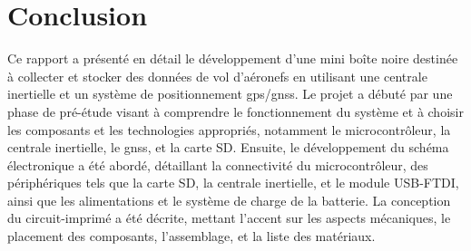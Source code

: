 \documentclass[12pt,a4paper,twoside]{article}
\newcommand\blankpage{%
	\null
	\thispagestyle{empty}%
	\addtocounter{page}{-1}%
	\newpage}
\begin{document}
\pagestyle{fancy}
\chead {\today}

 
\afterpage{\blankpage}

\clearpage

\tableofcontents
\clearpage

\printunsrtglossary[type=abbreviations]
\printunsrtglossary %













%

\clearpage

\section{Conclusion}

Ce rapport a présenté en détail le développement d'une mini boîte noire destinée à collecter et stocker des données de vol d'aéronefs en utilisant une centrale inertielle et un système de positionnement \gls{gps}/\gls{gnss}. Le projet a débuté par une phase de pré-étude visant à comprendre le fonctionnement du système et à choisir les composants et les technologies appropriés, notamment le microcontrôleur, la centrale inertielle, le \gls{gnss}, et la carte SD. Ensuite, le développement du schéma électronique a été abordé, détaillant la connectivité du microcontrôleur, des périphériques tels que la carte SD, la centrale inertielle, et le module USB-FTDI, ainsi que les alimentations et le système de charge de la batterie. La conception du circuit-imprimé a été décrite, mettant l'accent sur les aspects mécaniques, le placement des composants, l'assemblage, et la liste des matériaux.
\end{document}
